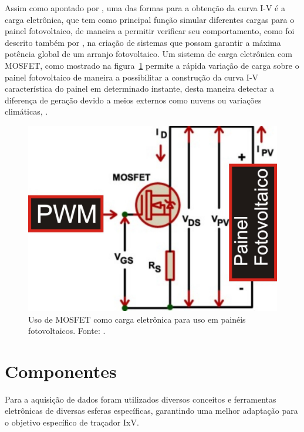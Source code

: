 Assim como apontado por , uma das formas para a obtenção da curva I-V é a carga eletrônica, que tem como principal função simular diferentes cargas para o painel fotovoltaico, de maneira a permitir verificar seu comportamento, como foi descrito também por , na criação de sistemas que possam garantir a máxima potência global de um arranjo fotovoltaico. Um sistema de carga eletrônica com MOSFET, como mostrado na figura~\ref{fig:CargaELE} permite a rápida variação de carga sobre o painel fotovoltaico de maneira a possibilitar a construção da curva I-V característica do painel em determinado instante, desta maneira detectar a diferença de geração devido a meios externos como nuvens ou variações climáticas, \cite{WILLOUGHBY2018171}.%

\FloatBarrier
\begin{figure}[!htbp]
	\centering
	\includegraphics[scale=1]{imagens/MOSFET_LOAD}
	\caption{Uso de MOSFET como carga eletrônica para uso em painéis fotovoltaicos. Fonte: . }
	
	\label{fig:CargaELE}
\end{figure}
\FloatBarrier

\section{Componentes}

Para a aquisição de dados foram utilizados diversos conceitos e ferramentas eletrônicas de diversas esferas específicas, garantindo uma melhor adaptação para o objetivo específico de traçador IxV.%

